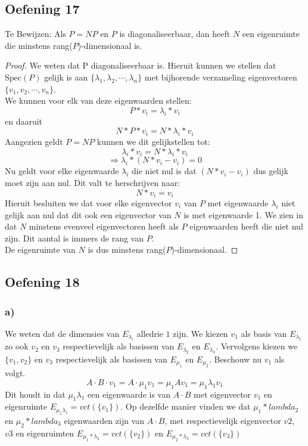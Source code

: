 \documentclass[lineaire_algebra_oplossingen.tex]{subfiles}
\begin{document}
\subsection{Oefening 17}

Te Bewijzen:
Als $P = NP$ en $P$ is diagonaliseerbaar, dan heeft $N$ een eigenruimte die minstens rang($P$)-dimensionaal is.
\begin{proof}
We weten dat P diagonaliseerbaar is. Hieruit kunnen we stellen dat $\text{Spec}(P)$ gelijk is aan $\{\lambda_1, \lambda_2,\cdots,\lambda_n\}$ met bijhorende verzameling eigenvectoren $\{v_1, v_2,\cdots,v_n\}$.\\
We kunnen voor elk van deze eigenwaarden stellen:
\[P*v_i = \lambda_i*v_i\]
en daaruit
\[N*P*v_i = N*\lambda_i*v_i\]
Aangezien geldt $P=NP$ kunnen we dit gelijkstellen tot:
\[\lambda_i*v_i = N*\lambda_i*v_i\]
\[\Rightarrow \lambda_i * (N*v_i - v_i) = 0\]
Nu geldt voor elke eigenwaarde $\lambda_i$ die niet nul is dat $(N*v_i - v_i)$ dus gelijk moet zijn aan nul. Dit valt te herschrijven naar:
\[N*v_i = v_i\]
Hieruit besluiten we dat voor elke eigenvector $v_i$ van $P$ met eigenwaarde $\lambda_i$ niet gelijk aan nul dat dit ook een eigenvector van $N$ is met eigenwaarde 1.
We zien in dat $N$ minstens evenveel eigenvectoren heeft als $P$ eigenwaarden heeft die niet nul zijn. Dit aantal is immers de rang van $P$. \\
De eigenruimte van $N$ is dus minstens rang($P$)-dimensionaal.
\end{proof}


\subsection{Oefening 18}
\subsubsection*{a)}
We weten dat de dimensies van $E_{\lambda_i}$ alledrie $1$ zijn.
We kiezen $v_1$ als basis van $E_{\lambda_1}$ zo ook $v_2$ en $v_3$ respectievelijk als basissen van $E_{\lambda_2}$ en $E_{\lambda_3}$.
Vervolgens kiezen we $\{v_1,v_2\}$ en $v_3$ respectievelijk als basissen van $E_{\mu_1}$ en $E_{\mu_2}$.
Beschouw nu $v_1$ als volgt.
\[
A\cdot B\cdot v_1 = A\cdot\mu_1v_1 = \mu_1Av_1= \mu_1\lambda_1v_1
\]
Dit houdt in dat $\mu_1\lambda_1$ een eigenwaarde is van $A\cdot B$ met eigenvector $v_1$ en eigenruimte $E_{\mu_1\lambda_1} = vct(\{v_1\})$. Op dezelfde manier vinden we dat $\mu_1*lambda_2$ en $\mu_2*lambda_3$ eigenwaarden zijn van $A\cdot B$, met respectievelijk eigenvector $v2$, $v3$ en eigenruimten $E_{\mu_1*\lambda_2} = vct(\{v_2\})$ en $E_{\mu_2*  \lambda_3} = vct(\{v_3\})$
\end{document}
